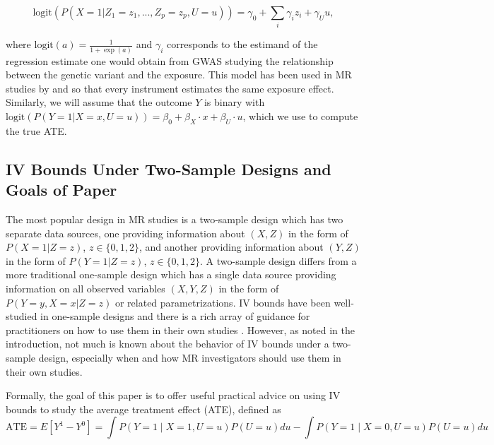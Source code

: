 \documentclass[AMA,STIX1COL,]{WileyNJD-v2}
\begin{document}
\begin{equation}
\text{logit}(P(X = 1 | Z_1 = z_1, ..., Z_p = z_p, U = u)) = \gamma_0 + \sum_i \gamma_i z_i + \gamma_U u,
\end{equation}

where \(\text{logit}(a) = \frac{1}{1+\exp(a)}\) and \(\gamma_i\)
corresponds to the estimand of the regression estimate one would obtain
from GWAS studying the relationship between the genetic variant and the
exposure. This model has been used in MR studies by
\citep{burgess_sample_2014} and \citep{burgess_improving_2012} so that
every instrument estimates the same exposure effect. Similarly, we will
assume that the outcome \(Y\) is binary with
\(\text{logit}(P(Y = 1 | X = x, U = u)) = \beta_0 + \beta_X \cdot x + \beta_U \cdot u\),
which we use to compute the true ATE.

\label{logistic-models}

\hypertarget{iv-bounds-under-two-sample-designs-and-goals-of-paper}{%
\subsection{IV Bounds Under Two-Sample Designs and Goals of
Paper}\label{iv-bounds-under-two-sample-designs-and-goals-of-paper}}

\label{review-study-designs-and-target-estimand}

The most popular design in MR studies is a two-sample design which has
two separate data sources, one providing information about \((X,Z)\) in
the form of \(P(X = 1 | Z = z)\), \(z \in \{0, 1, 2\}\), and another
providing information about \((Y,Z)\) in the form of
\(P(Y = 1 | Z = z)\), \(z \in \{0, 1, 2\}\). A two-sample design differs
from a more traditional one-sample design which has a single data source
providing information on all observed variables \((X,Y,Z)\) in the form
of \(P(Y = y, X = x | Z = z)\) or related parametrizations. IV bounds
have been well-studied in one-sample designs and there is a rich array
of guidance for practitioners on how to use them in their own studies
\citep{balke_bounds_1997, richardson_ace_2014, swanson_partial_2018}.
However, as noted in the introduction, not much is known about the
behavior of IV bounds under a two-sample design, especially when and how
MR investigators should use them in their own studies.

Formally, the goal of this paper is to offer useful practical advice on
using IV bounds to study the average treatment effect (ATE), defined as
\[
\text{ATE} = E[Y^1 - Y^0] = \int P(Y=1 \mid X = 1, U=u) P(U=u) du - \int P(Y=1 \mid X = 0, U=u) P(U=u) du
\]
\end{document}
